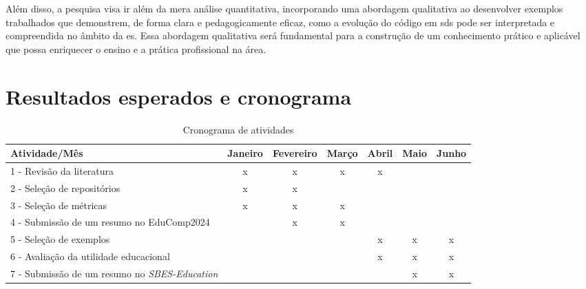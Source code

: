 Além disso, a pesquisa visa ir além da mera análise quantitativa, incorporando uma abordagem qualitativa ao desenvolver exemplos trabalhados que demonstrem, de forma clara e pedagogicamente eficaz, como a evolução do código em \gls{sds} pode ser interpretada e compreendida no âmbito da \gls{es}. Essa abordagem qualitativa será fundamental para a construção de um conhecimento prático e aplicável que possa enriquecer o ensino e a prática profissional na área.

\section{Resultados esperados e cronograma}

\begin{table}[b]
\centering
\caption{Cronograma de atividades}
\label{table:schedule}
\begin{tabular}{lcccccc}
Atividade/Mês & Janeiro & Fevereiro & Março & Abril & Maio & Junho  \\
\hline
1 - Revisão da literatura & x & x & x & x & & \\
2 - Seleção de repositórios & x & x & & & & \\
3 - Seleção de métricas & x & x & x & & & \\
4 - Submissão de um resumo no EduComp2024 & & x & x & & & \\
5 - Seleção de exemplos & & & & x & x & x \\
6 - Avaliação da utilidade educacional & & & & x & x & x \\
7 - Submissão de um resumo no \textit{SBES-Education} & & & & & x & x
\end{tabular}
\end{table}

